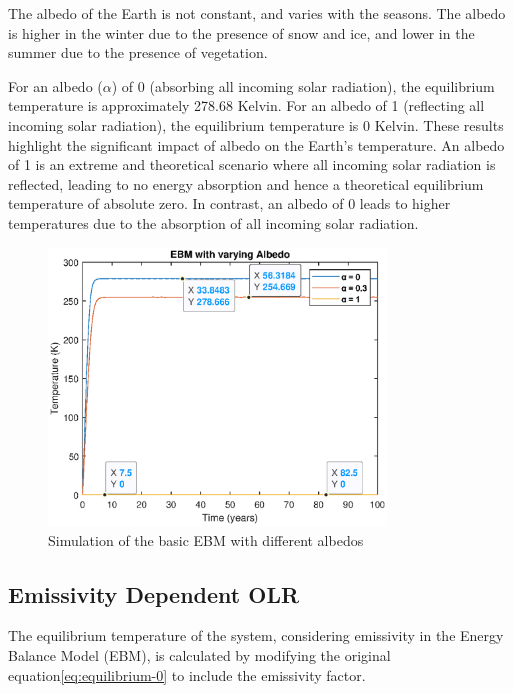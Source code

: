 \documentclass[12pt]{article}
\begin{document}

The albedo of the Earth is not constant, and varies with the seasons. The albedo is higher in the winter due to the presence of snow and ice, and lower in the summer due to the presence of vegetation\cite{kaper-2013-math-ac-albedo}.

For an albedo ($\alpha$) of 0 (absorbing all incoming solar radiation), the equilibrium temperature is approximately 278.68 Kelvin. For an albedo of 1 (reflecting all incoming solar radiation), the equilibrium temperature is 0 Kelvin. These results highlight the significant impact of albedo on the Earth's temperature. An albedo of 1 is an extreme and theoretical scenario where all incoming solar radiation is reflected, leading to no energy absorption and hence a theoretical equilibrium temperature of absolute zero. In contrast, an albedo of 0 leads to higher temperatures due to the absorption of all incoming solar radiation.

\begin{figure}[!hbt]
    \centering
    \includegraphics[width=0.8\textwidth]{images/albedo_extremes.eps}
    \caption{Simulation of the basic EBM with different albedos}
    \label{fig:albedo_extremes}
\end{figure}

\subsection{Emissivity Dependent OLR}
The equilibrium temperature of the system, considering emissivity in the Energy Balance Model (EBM), is calculated by modifying the original equation\ref{eq:equilibrium-0} to include the emissivity factor\cite{kaper-2013-math-ac-emissivity}.
\end{document}
